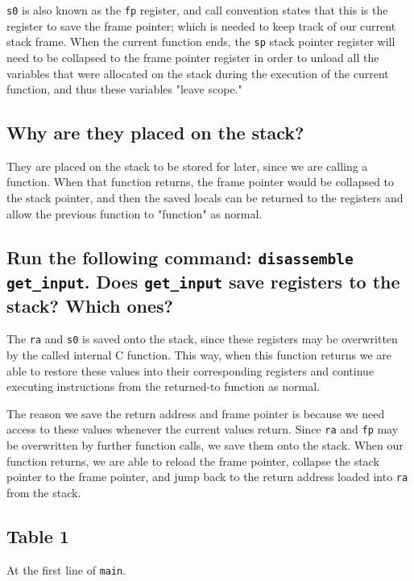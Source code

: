 \documentclass[12pt, letterpaper]{article}
\begin{document}
\texttt{s0} is also known as the \texttt{fp} register, and call convention states that this is the register to save the frame pointer; which is needed to keep track of our current stack frame. When the current function ends, the \texttt{sp} stack pointer register will need to be collapsed to the frame pointer register in order to unload all the variables that were allocated on the stack during the execution of the current function, and thus these variables "leave scope."

\subsection*{Why are they placed on the stack?}

They are placed on the stack to be stored for later, since we are calling a function. When that function returns, the frame pointer would be collapsed to the stack pointer, and then the saved locals can be returned to the registers and allow the previous function to "function" as normal.


\subsection*{Run the following command: \texttt{disassemble get\_input}. Does \texttt{get\_input} save registers to the stack? Which ones?}

The \texttt{ra} and \texttt{s0} is saved onto the stack, since these registers may be overwritten by the called internal C function. This way, when this function returns we are able to restore these values into their corresponding registers and continue executing instructions from the returned-to function as normal.
\medskip

The reason we save the return address and frame pointer is because we need access to these values whenever the current values return. Since \texttt{ra} and \texttt{fp} may be overwritten by further function calls, we save them onto the stack. When our function returns, we are able to reload the frame pointer, collapse the stack pointer to the frame pointer, and jump back to the return address loaded into \texttt{ra} from the stack.

\subsection*{Table 1}

At the first line of \texttt{main}.
\end{document}
